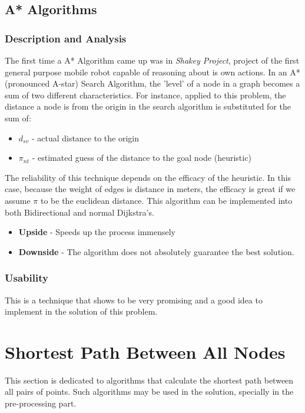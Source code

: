 \subsection{A* Algorithms}
\subsubsection{Description and Analysis}
The first time a A* Algorithm came up was in \textit{Shakey Project}, project of the first general purpose mobile robot capable of reasoning about is own actions. In an A* (pronounced A-star) Search Algorithm, the 'level' of a node in a graph becomes a sum of two different characteristics. For instance, applied to this problem, the distance a node is from the origin in the search algorithm is substituted for the sum of:
\begin{itemize}
    \item $d_{sv}$ - actual distance to the origin
    \item $\pi_{nt}$ - estimated guess of the distance to the goal node (heuristic)
\end{itemize}
The reliability of this technique depends on the efficacy of the heuristic. In this case, because the weight of edges is distance in meters, the efficacy is great if we assume $\pi$ to be the euclidean distance. This algorithm can be implemented into both Bidirectional and normal Dijkstra's.
\begin{itemize}
    \item \textbf{Upside} - Speeds up the process immensely
    \item \textbf{Downside} - The algorithm does not absolutely guarantee the best solution.
\end{itemize}

\subsubsection{Usability}
This is a technique that shows to be very promising and a good idea to implement in the solution of this problem.



\newpage
\section{Shortest Path Between All Nodes}
This section is dedicated to algorithms that calculate the shortest path between all pairs of points. Such algorithms may be used in the solution, specially in the pre-processing part.

